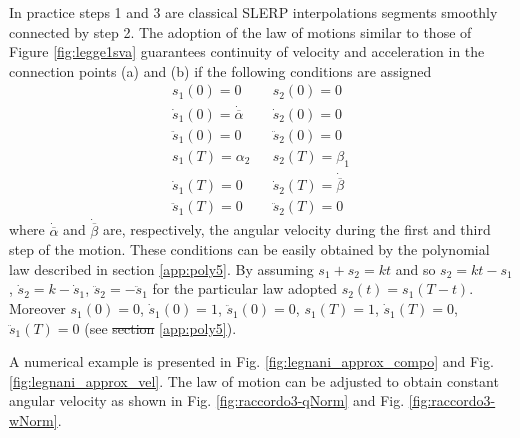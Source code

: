 \documentclass[preprint, 12pt]{elsarticle}
\providecommand{\DIFadd}[1]{{\protect\color{blue}\uwave{#1}}} %
\providecommand{\DIFdel}[1]{{\protect\color{red}\sout{#1}}}                      %
\providecommand{\DIFaddbegin}{} %
\providecommand{\DIFaddend}{} %
\providecommand{\DIFdelbegin}{} %
\providecommand{\DIFdelend}{} %
\begin{document}
In practice steps 1 and 3 are classical SLERP interpolations segments smoothly connected by step 2. The adoption of the law of motions similar to those of Figure  \ref{fig:legge1sva} guarantees continuity of velocity and acceleration in the connection points (a) and (b) if the following  conditions are assigned
\begin{equation}
    \begin{array}{lcl}
        s_1(0)= 0 && s_2(0)=0\\
        \dot{s}_1(0)=\dot{\overline{\alpha}} && \dot{s}_2(0)=0 \\
        \ddot{s}_1(0)=0 && \ddot{s}_2(0)=0\\
        s_1(T)= \alpha_2 && s_2(T)=\beta_1\\
        \dot{s}_1(T)=0 && \dot{s}_2(T)=\dot{\overline{\beta}} \\
        \ddot{s}_1(T)=0 && \ddot{s}_2(T)=0
    \end{array}
    \label{eq:limits}
\end{equation}
where $\dot{\overline{\alpha}}$ and $\dot{\overline{\beta}}$ are, respectively, the angular velocity during the first and third step of the motion. These conditions can be easily obtained by the polynomial law described in section \ref{app:poly5}.
By assuming $s_1+s_2=k t$ and so $s_2=kt-s_1$, $\dot{s}_2=k-\dot{s}_1$, $\ddot{s}_2=-\ddot{s}_1$ for the particular law adopted $s_2(t)=s_1(T-t)$. Moreover $s_1(0)=0$, $\dot{s}_1(0)=1$, $\ddot{s}_1(0)=0$, $s_1(T)=1$,  $\dot{s}_1(T)=0$, $\ddot{s}_1(T)=0$ (see \DIFdelbegin \DIFdel{section }\DIFdelend \ref{app:poly5}). 

A numerical example \DIFaddbegin \DIFadd{of the exposed procedure }\DIFaddend is presented in Fig. \ref{fig:legnani_approx_compo} and Fig. \ref{fig:legnani_approx_vel}. The law of motion can be adjusted to obtain constant angular velocity as shown in Fig. \ref{fig:raccordo3-qNorm} and Fig. \ref{fig:raccordo3-wNorm}.
\end{document}
